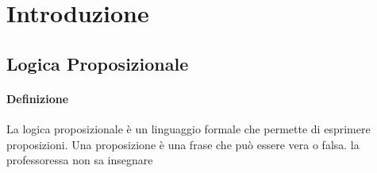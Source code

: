 \documentclass{article}
\begin{document}
\tableofcontents
\section{Introduzione}
\subsection{Logica Proposizionale}
\paragraph{Definizione} La logica proposizionale è un linguaggio formale che permette di esprimere proposizioni. Una proposizione è una frase che può essere vera o falsa.
la professoressa non sa insegnare
\end{document}
